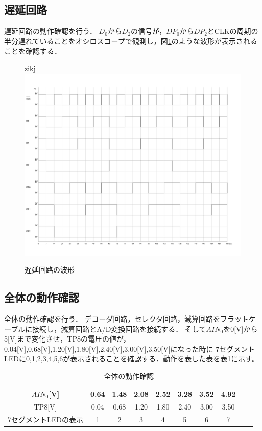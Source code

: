 \documentclass[a4paper,11pt,dvipdfmx]{jsarticle}
\begin{document}
\subsection{遅延回路}
遅延回路の動作確認を行う．
$D_0$から$D_2$の信号が，$DP_0$から$DP_2$とCLKの周期の半分遅れていることをオシロスコープで観測し，図\ref{fig:delay}のような波形が表示されることを確認する．

\begin{figure}[H]zikj
  \centering
  \includegraphics[width=1.0\linewidth]{./images/delay.png}
  \caption{遅延回路の波形}
  \label{fig:delay}
\end{figure}

\subsection{全体の動作確認}
全体の動作確認を行う．
デコーダ回路，セレクタ回路，減算回路をフラットケーブルに接続し，減算回路とA/D変換回路を接続する．
そして$AIN_0$を0[V]から5[V]まで変化させ，TP8の電圧の値が，0.04[V],0.68[V],1.20[V],1.80[V],2.40[V],3.00[V],3.50[V]になった時に
7セグメントLEDに0,1,2,3,4,5,6が表示されることを確認する．動作を表した表を表\ref{tab:operation}に示す。

\begin{table}[H]
  \centering
  \caption{全体の動作確認}
  \begin{tabular}{|c|c|c|c|c|c|c|c|c|c|}
    \hline
    $AIN_0$[V] & 0.64 & 1.48 & 2.08 & 2.52 & 3.28 & 3.52 & 4.92 \\
    \hline
    TP8[V] & 0.04 & 0.68 & 1.20 & 1.80 & 2.40 & 3.00 & 3.50 \\
    \hline
    7セグメントLEDの表示 & 1 & 2 & 3 & 4 & 5 & 6 & 7 \\
    \hline
  \end{tabular}
  \label{tab:operation}
\end{table}
\end{document}
